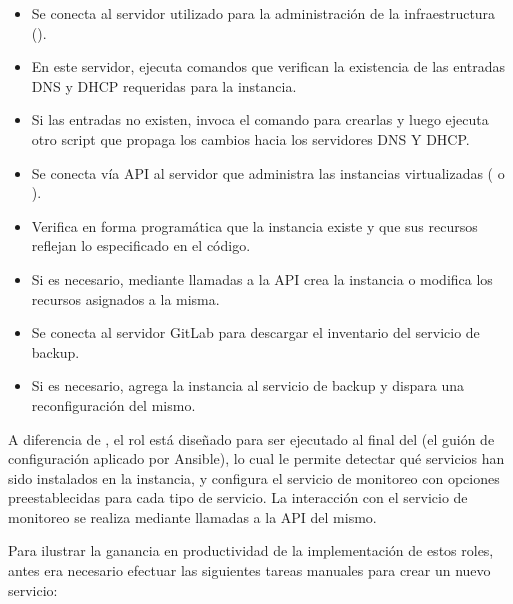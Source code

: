 \begin{itemize}
\item Se conecta al servidor utilizado para la administración de la
  infraestructura ().
\item En este servidor, ejecuta comandos que verifican la existencia
  de las entradas DNS y DHCP requeridas para la instancia.
\item Si las entradas no existen, invoca el comando para crearlas y
  luego ejecuta otro script que propaga los cambios hacia los
  servidores DNS Y DHCP.
\item Se conecta vía API al servidor que administra las instancias
  virtualizadas ( o ).
\item Verifica en forma programática que la instancia existe y que sus
  recursos reflejan lo especificado en el código.
\item Si es necesario, mediante llamadas a la API crea la instancia o
  modifica los recursos asignados a la misma.
\item Se conecta al servidor GitLab para descargar el inventario del
  servicio de backup.
\item Si es necesario, agrega la instancia al servicio de backup y
  dispara una reconfiguración del mismo.
\end{itemize}
A diferencia de , el rol  está
diseñado para ser ejecutado al final del  (el guión
de configuración aplicado por Ansible), lo cual le permite detectar
qué servicios han sido instalados en la instancia, y configura el
servicio de monitoreo con opciones preestablecidas para cada tipo de
servicio. La interacción con el servicio de monitoreo se realiza
mediante llamadas a la API del mismo.

Para ilustrar la ganancia en productividad de la implementación de
estos roles, antes era necesario efectuar las siguientes tareas
manuales para crear un nuevo servicio:


